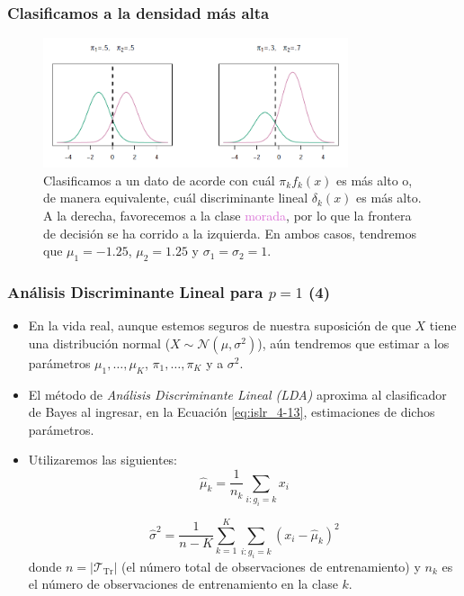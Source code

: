 \documentclass[usenames,dvipsnames]{beamer} %
\newcommand\defi[1]{\textcolor{NavyBlue}{\textit{#1}}}
\begin{document}
\begin{frame}\frametitle{Clasificamos a la densidad m\'as alta}
\begin{figure}
	\centering
	\includegraphics[width=0.8\textwidth]{images/islr_lectures/densidad_alta.png}
	\caption{Clasificamos a un dato de acorde con cu\'al $\pi_k f_k(x)$ es m\'as alto o, de manera equivalente, cu\'al discriminante lineal $\delta_k(x)$ es m\'as alto. A la derecha, favorecemos a la clase \textcolor{Orchid}{morada}, por lo que la frontera de decisi\'on se ha corrido a la izquierda. En ambos casos, tendremos que $\mu_1=-1.25$, $\mu_2=1.25$ y $\sigma_1=\sigma_2=1$.}
	\label{fig:islr_lectures-densidad_alta}
\end{figure}
\end{frame}

\begin{frame}\frametitle{An\'alisis Discriminante Lineal para $p=1$ (4)}
\begin{itemize}
	\item En la vida real, aunque estemos seguros de nuestra suposici\'on de que $X$ tiene una distribuci\'on normal ($X\sim \mathcal{N}(\mu, \sigma^2)$), a\'un tendremos que estimar a los par\'ametros $\mu_1, \dotsc, \mu_K$, $\pi_1, \dotsc, \pi_K$ y a $\sigma^2$. 
	\item El m\'etodo de \defi{An\'alisis Discriminante Lineal (LDA)} aproxima al clasificador de Bayes al ingresar, en la Ecuaci\'on \ref{eq:islr_4-13}, estimaciones de dichos par\'ametros.
	\item Utilizaremos las siguientes:
	\begin{equation}\label{eq:islr_4-15-a}
	\hat \mu_k = \frac{1}{n_k} \sum_{i:g_i=k}x_i
	\end{equation}
	
	\begin{equation}\label{eq:islr_4-15}
	\hat \sigma^2 = \frac{1}{n - K} \sum_{k=1}^{K}\sum_{i:g_i=k}(x_i-\hat \mu_k)^2
	\end{equation}
	donde $n=|\mathcal{T}_{\text{Tr}}|$ (el n\'umero total de observaciones de entrenamiento) y $n_k$ es el n\'umero de observaciones de entrenamiento en la clase $k$.
\end{itemize}
\end{frame}
\end{document}

